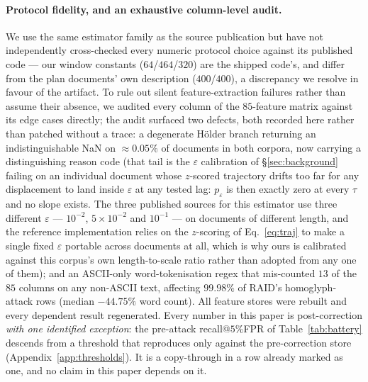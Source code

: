 \documentclass{article}
\begin{document}
\paragraph{Protocol fidelity, and an exhaustive column-level audit.} We use
the same estimator family as the source publication but have not independently
cross-checked every numeric protocol choice against its published code --- our
window constants ($64$/$464$/$320$) are the shipped code's, and differ from the
plan documents' own description ($400$/$400$), a discrepancy we resolve in
favour of the artifact. To rule out silent feature-extraction failures rather
than assume their absence, we audited every column of the $85$-feature matrix
against its edge cases directly; the audit surfaced two defects, both recorded
here rather than patched without a trace: a degenerate H\"older branch returning an indistinguishable NaN
on $\approx0.05\%$ of documents in both corpora, now carrying a distinguishing
reason code (that tail is the $\varepsilon$ calibration of \S\ref{sec:background}
failing on an individual document whose $z$-scored trajectory drifts too far for
any displacement to land inside $\varepsilon$ at any tested lag: $p_\varepsilon$
is then exactly zero at every $\tau$ and no slope exists. The three published
sources for this estimator use three different $\varepsilon$ --- $10^{-2}$,
$5\!\times\!10^{-2}$ and $10^{-1}$ --- on documents of different length, and the
reference implementation relies on the $z$-scoring of Eq.~\ref{eq:traj} to make a
single fixed $\varepsilon$ portable across documents at all, which is why ours is
calibrated against this corpus's own length-to-scale ratio rather than adopted
from any one of them); and an ASCII-only word-tokenisation regex that mis-counted $13$ of
the $85$ columns on any non-ASCII text, affecting $99.98\%$ of RAID's
homoglyph-attack rows (median $-44.75\%$ word count). All feature stores were
rebuilt and every dependent result regenerated. Every number in this paper is
post-correction \emph{with one identified exception}: the pre-attack
recall@$5\%$FPR of Table~\ref{tab:battery} descends from a threshold that
reproduces only against the pre-correction store (Appendix~\ref{app:thresholds}).
It is a copy-through in a row already marked as one, and no claim in this paper
depends on it.
\end{document}
